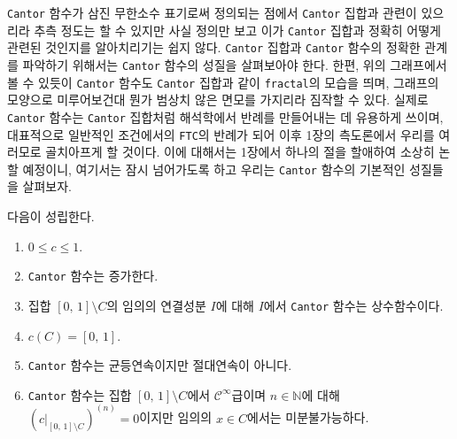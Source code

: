 \texttt{Cantor} 함수가 삼진 무한소수 표기로써 정의되는 점에서 \texttt{Cantor} 집합과 관련이 있으리라 추측 정도는 할 수 있지만 사실 정의만 보고 이가 \texttt{Cantor} 집합과 정확히 어떻게 관련된 것인지를 알아치리기는 쉽지 않다. \texttt{Cantor} 집합과 \texttt{Cantor} 함수의 정확한 관계를 파악하기 위해서는 \texttt{Cantor} 함수의 성질을 살펴보아야 한다. 한편, 위의 그래프에서 볼 수 있듯이 \texttt{Cantor} 함수도 \texttt{Cantor} 집합과 같이 \texttt{fractal}의 모습을 띄며, 그래프의 모양으로 미루어보건대 뭔가 범상치 않은 면모를 가지리라 짐작할 수 있다. 실제로 \texttt{Cantor} 함수는 \texttt{Cantor} 집합처럼 해석학에서 반례를 만들어내는 데 유용하게 쓰이며, 대표적으로 일반적인 조건에서의 \texttt{FTC}의 반례가 되어 이후 1장의 측도론에서 우리를 여러모로 골치아프게 할 것이다. 이에 대해서는 1장에서 하나의 절을 할애하여 소상히 논할 예정이니, 여기서는 잠시 넘어가도록 하고 우리는 \texttt{Cantor} 함수의 기본적인 성질들을 살펴보자.

\begin{theorem}
    다음이 성립한다.
    \begin{enumerate}
        \item $0\leq c\leq1$.
        \item \texttt{Cantor} 함수는 증가한다.
        \item 집합 $[0,\,1]\setminus C$의 임의의 연결성분 $I$에 대해 $I$에서 \texttt{Cantor} 함수는 상수함수이다.
        \item $c(C)=[0,\,1]$.
        \item \texttt{Cantor} 함수는 균등연속이지만 절대연속이 아니다.\footnotemark
        \item \texttt{Cantor} 함수는 집합 $[0,\,1]\setminus C$에서 $\mathcal{C}^\infty$급이며 $n\in\mathbb{N}$에 대해 $(c\vert_{[0,\,1]\setminus C})^{(n)}=0$이지만 임의의 $x\in C$에서는 미분불가능하다.
    \end{enumerate}
\end{theorem}

